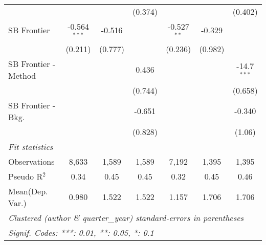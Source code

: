 \begin{tabular}{lcccccc}
                        &                &         & (0.374) &               &         & (0.402)\\   
   SB Frontier          & -0.564$^{***}$ & -0.516  &         & -0.527$^{**}$ & -0.329  &   \\   
                        & (0.211)        & (0.777) &         & (0.236)       & (0.982) &   \\   
   SB Frontier - Method &                &         & 0.436   &               &         & -14.7$^{***}$\\   
                        &                &         & (0.744) &               &         & (0.658)\\   
   SB Frontier - Bkg.   &                &         & -0.651  &               &         & -0.340\\   
                        &                &         & (0.828) &               &         & (1.06)\\   
   \midrule
   \emph{Fit statistics}\\
   Observations         & 8,633          & 1,589   & 1,589   & 7,192         & 1,395   & 1,395\\  
   Pseudo R$^2$         & 0.34           & 0.45    & 0.45    & 0.32          & 0.45    & 0.46\\  
Mean(Dep. Var.) & 0.980 & 1.522 & 1.522 & 1.157 & 1.706 & 1.706 \\
   \midrule \midrule
   \multicolumn{7}{l}{\emph{Clustered (author \& quarter\_year) standard-errors in parentheses}}\\
   \multicolumn{7}{l}{\emph{Signif. Codes: ***: 0.01, **: 0.05, *: 0.1}}\\
\end{tabular}
\par\endgroup
